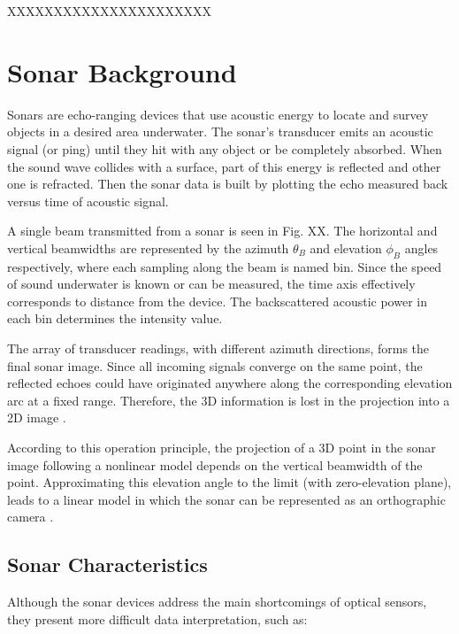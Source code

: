 \documentclass[final,5p,times]{elsarticle}
\begin{document}
XXXXXXXXXXXXXXXXXXXXXX


\section{Sonar Background}
\label{sonar:background}

Sonars are echo-ranging devices that use acoustic energy to locate and survey objects in a desired area underwater. The sonar's transducer emits an acoustic signal (or ping) until they hit with any object or be completely absorbed. When the sound wave collides with a surface, part of this energy is reflected and other one is refracted. Then the sonar data is built by plotting the echo measured back versus time of acoustic signal.

A single beam transmitted from a sonar is seen in Fig. XX. The horizontal and vertical beamwidths are represented by the azimuth $\theta_{B}$ and elevation $\phi_{B}$ angles respectively, where each sampling along the beam is named bin. Since the speed of sound underwater is known or can be measured, the time axis effectively corresponds to distance from the device. The backscattered acoustic power in each bin determines the intensity value.

The array of transducer readings, with different azimuth directions, forms the final sonar image. Since all incoming signals converge on the same point, the reflected echoes could have originated anywhere along the corresponding elevation arc at a fixed range. Therefore, the 3D information is lost in the projection into a 2D image \cite{hurtos2014b}.

According to this operation principle, the projection of a 3D point in the sonar image following a nonlinear model depends on the vertical beamwidth of the point. Approximating this elevation angle to the limit (with zero-elevation plane), leads to a linear model in which the sonar can be represented as an orthographic camera \cite{johannsson2010}.

\subsection{Sonar Characteristics}

Although the sonar devices address the main shortcomings of optical sensors, they present more difficult data interpretation, such as:
\end{document}

